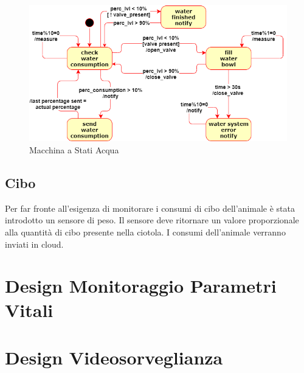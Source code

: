     \begin{figure}[H]
        \caption{Macchina a Stati Acqua}
        \label{fig:statediagramWater}
        \centering
        \includegraphics[width=1\textwidth]{DrawIo/stateDiagramWater.png}
    \end{figure}
    
    \subsection{Cibo}
    Per far fronte all'esigenza di monitorare i consumi di cibo dell'animale è stata introdotto un sensore di peso. Il sensore deve ritornare un valore proporzionale alla quantità di cibo presente nella ciotola. I consumi dell'animale verranno inviati in cloud. 
    
    
\section{Design Monitoraggio Parametri Vitali}

\section{Design Videosorveglianza}

